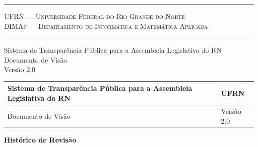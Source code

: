\documentclass[12pt, a4paper]{article}
\begin{document}
    \begin{titlepage}
        \flushright
        \rule{\textwidth}{1pt}
        {\large \textsc{UFRN --- Universidade Federal do Rio Grande do Norte
                \\[0.5ex]
         \normalsize DIMAp --- Departamento de Informática e Matemática Aplicada}
        \vspace{-0.5ex}}
        \rule{\textwidth}{1pt}

        \vfill

        {\Huge Sistema de Transparência Pública para a Assembleia Legislativa
        do RN \\[1ex] \LARGE Documento de Visão \\[2ex] \large Versão 2.0}

        \vfill

    \end{titlepage}

    \begin{tabu}{X | X[-1]}
        \hline
        Sistema de Transparência Pública para a Assembleia Legislativa do RN &
        UFRN
        \\ \hline

        Documento de Visão &
        Versão 2.0
        \\ \hline
    \end{tabu}

    \bigskip

    {\Large\textbf{Histórico de Revisão}}

    \vspace{2ex}
\end{document}
